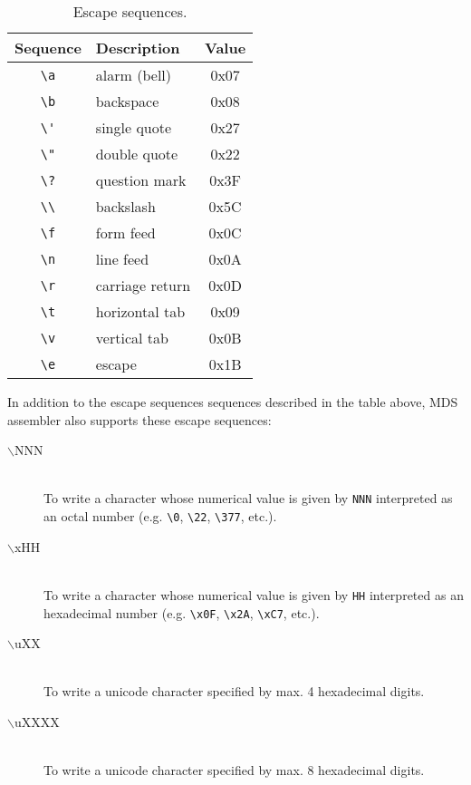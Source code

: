             \begin{table}[h!]
                \centering
                \begin{tabular}{|c|l|c|}
                    \hline
                    \textbf{Sequence} & \textbf{Description} & \textbf{Value} \\\hline
                    \verb'\a'         & alarm (bell)         & 0x07 \\\hline
                    \verb'\b'         & backspace            & 0x08 \\\hline
                    \verb"\'"         & single quote         & 0x27 \\\hline
                    \verb'\"'         & double quote         & 0x22 \\\hline
                    \verb'\?'         & question mark        & 0x3F \\\hline
                    \verb'\\'         & backslash            & 0x5C \\\hline
                    \verb'\f'         & form feed            & 0x0C \\\hline
                    \verb'\n'         & line feed            & 0x0A \\\hline
                    \verb'\r'         & carriage return      & 0x0D \\\hline
                    \verb'\t'         & horizontal tab       & 0x09 \\\hline
                    \verb'\v'         & vertical tab         & 0x0B \\\hline
                    \verb'\e'         & escape               & 0x1B \\\hline
                \end{tabular}
                \caption{Escape sequences.}
            \end{table}

            In addition to the escape sequences sequences described in the table above, MDS assembler also supports these escape sequences:
            \begin{description}
                \item[$\backslash$NNN]~\\
                    To write a character whose numerical value is given by \texttt{NNN} interpreted as an octal number (e.g. \verb'\0', \verb'\22', \verb'\377', etc.).
                \item[$\backslash$xHH]~\\
                    To write a character whose numerical value is given by \texttt{HH} interpreted as an hexadecimal number (e.g. \verb'\x0F', \verb'\x2A', \verb'\xC7', etc.).
                \item[$\backslash$uXX]~\\
                    To write a unicode character specified by max. 4 hexadecimal digits.
                \item[$\backslash$uXXXX]~\\
                    To write a unicode character specified by max. 8 hexadecimal digits.
            \end{description}

